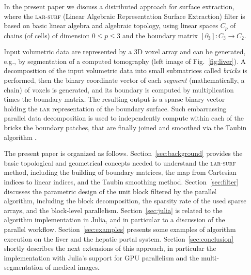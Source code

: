 In the present paper we discuss a distributed approach for surface extraction, where the \textsc{lar-surf} (Linear Algebraic Representation Surface Extraction) filter is based on basic linear algebra and algebraic topology, using linear spaces $C_p$ of chains (of cells) of dimension $0 \leq p \leq 3$ and the boundary matrix $[\partial_3] : C_3 \to C_2$.

Input volumetric data are represented by a 3D voxel array and can be generated, e.g., by segmentation of a computed tomography (left image of Fig.~\ref{fig:liver}). A decomposition of the input volumetric data into small submatrices called \emph{bricks} is performed, then the binary coordinate vector of each \emph{segment} (mathematically, a chain) of voxels is generated, and its boundary is computed by multiplication times the boundary matrix. The resulting output is a sparse binary vector holding the \textsc{lar} representation of the boundary surface. 
Such embarrassing parallel data decomposition is used to independently compute within each of the bricks the boundary patches, that are finally joined and smoothed via the Taubin algorithm \cite{Taubin1995}.

The present paper is organized as follows.
Section~\ref{sec:background} provides the basic topological and geometrical concepts needed to understand the \textsc{lar-surf} method, including the building of boundary matrices, the map from Cartesian indices to linear indices, and the Taubin smoothing method.
Section~\ref{sec:filter} discusses the parametric design of the unit block filtered by the parallel algorithm, including the block decomposition, the sparsity rate of the used sparse arrays, and the block-level parallelism.
Section~\ref{sec:julia} is related to the algorithm implementation in Julia, and in particular to a discussion of the parallel workflow.
Section~\ref{sec:examples} presents some examples of algorithm execution on the liver and the hepatic portal system.
Section~\ref{sec:conclusion} shortly describes the next extensions of this approach, in particular the implementation with Julia's support for GPU parallelism and the multi-segmentation of medical images.
